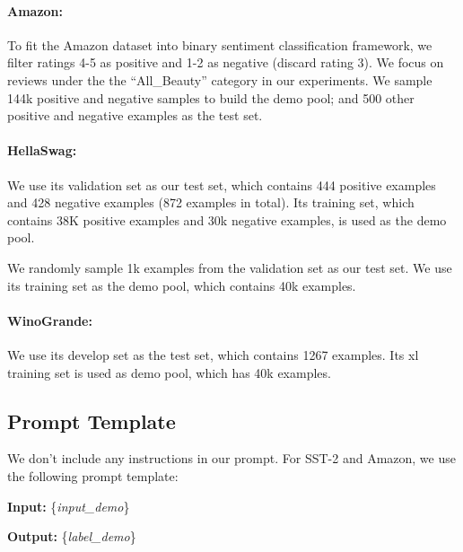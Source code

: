 \documentclass[11pt]{article}
\newcommand{\fzx}[1]{\textbf{\color{blue}[{\bf Zhouxiang}: #1]}}
\newcommand{\aayush}[1]{{\color{green}[{\bf Aayush}: #1]}}
\begin{document}
\paragraph{Amazon:}
To fit the Amazon dataset into binary sentiment classification framework, we filter ratings 4-5 as positive and 1-2 as negative (discard rating 3).
We focus on reviews under the the ``All\_Beauty'' category in our experiments. We sample 144k positive and negative samples to build the demo pool; and 500 other positive and negative examples as the test set.

\paragraph{HellaSwag:}
We use its validation set as our test set, which contains 444 positive examples and 428 negative examples (872 examples in total).
Its training set, which contains 38K positive examples and 30k negative examples, is used as the demo pool.

We randomly sample 1k examples from the validation set as our test set.
We use its training set as the demo pool, which contains 40k examples.



\paragraph{WinoGrande:}

We use its develop set as the test set, which contains 1267 examples.
Its xl training set is used as demo pool, which has 40k examples.



\subsection{Prompt Template}
\label{subsec:prompt}
We don't include any instructions in our prompt.
For SST-2 and Amazon, we use the following prompt template:

\textbf{Input:} \{\textit{input\_demo}\}

\textbf{Output:} \{\textit{label\_demo}\}
\end{document}
